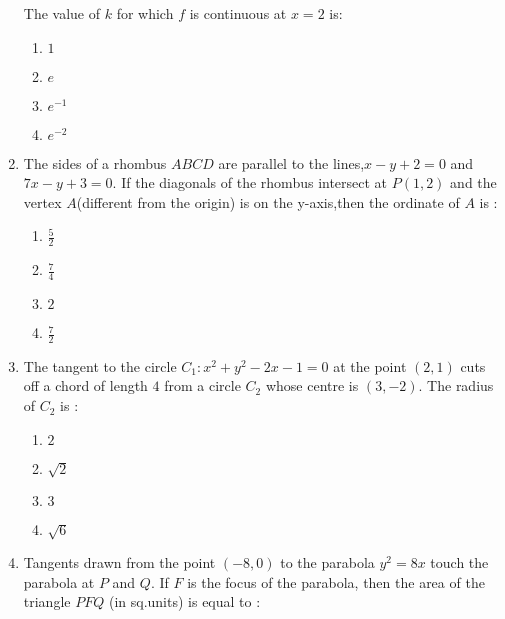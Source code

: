 \documentclass[journal,12pt,twocolumn]{IEEEtran}
\begin{document}
\begin{enumerate}[1.]
The value of $k$ for which $f$ is continuous at $x=2$ is:


\begin{enumerate}[(1)]
 
\item $
1
$

\item $
e
$

\item $
e^{-1}
$

\item $
e^{-2}
$


\end{enumerate}

\item The sides of a rhombus $ABCD$ are parallel to the lines,$x-y+2=0$ and $7x-y+3=0$. If the diagonals of the rhombus intersect at $P(1,2)$ and the vertex $A$(different from the origin) is on the y-axis,then the ordinate of $A$ is :


\begin{enumerate}[(1)]
 
\item $
\frac{5}{2}
$

\item $
\frac{7}{4}
$

\item $
2
$

\item $
\frac{7}{2}
$


\end{enumerate}

\item The tangent to the circle $C_{1} : x^2+y^2-2x-1=0 $ at the point $(2,1) $ cuts off a chord of length $ 4$ from a circle $C_{2}$ whose centre is $ (3,-2). $ The radius of $C_{2}$ is : 



\begin{enumerate}[(1)]
 
\item $
2
$

\item $
\sqrt{2}
$

\item $
3
$

\item $
\sqrt{6}
$


\end{enumerate}


\item Tangents drawn from the point $(-8,0)$ to the parabola $y^2=8x$ touch the parabola at $P$ and $Q$. If $F$ is the focus of the parabola, then the area of the triangle $PFQ$ (in sq.units) is equal to :



\end{enumerate}
\end{document}
